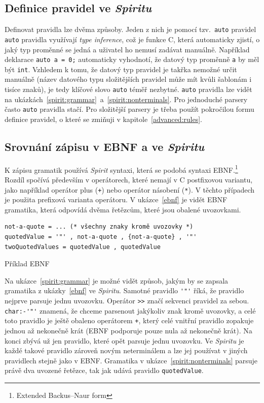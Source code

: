 \documentclass[thesis=B,czech,hidelinks]{FITthesis}[2019/03/06]
\newcommand{\Rplus}{\protect\hspace{-.1em}\protect\raisebox{.35ex}{\smaller{\smaller\textbf{+}}}}
\newcommand{\Cpp}{\mbox{C\Rplus\Rplus}\xspace}
\begin{document}
\subsection{Definice pravidel ve \textit{Spiritu}}
Definovat pravidla lze dvěma způsoby. Jeden z nich je pomocí tzv.\ \texttt{auto} pravidel \texttt{auto} pravidla využívají \textit{type inference}, což je funkce \Cpp{}, která automaticky zjistí, o jaký typ proměnné se jedná a uživatel ho nemusí zadávat manuálně. Například deklarace \verb¨auto a = 0;¨ automaticky vyhodnotí, že datový typ proměnně \texttt{a} by měl být \texttt{int}. Vzhledem k tomu, že datový typ pravidel je takřka nemožné určit manuálně (název datového typu složitějších pravidel může mít kvůli šablonám i tisíce znaků), je tedy klíčové slovo \texttt{auto} téměř nezbytné. \texttt{auto} pravidla lze vidět na ukázkách~\ref{spirit:grammar}~a~\ref{spirit:nonterminals}. Pro jednoduché parsery často \texttt{auto} pravidla stačí. Pro složitější parsery je třeba použít pokročilou formu definice pravidel, o které se zmiňuji v kapitole~\ref{advanced:rules}.

\subsection{Srovnání zápisu v EBNF a ve \textit{Spiritu}}
K zápisu gramatik používá \textit{Spirit} syntaxi, která se podobá syntaxi EBNF.\footnote{Extended Backus--Naur form} Rozdíl spočívá především v operátorech, které nemají v \Cpp{} postfixovou variantu, jako například operátor plus (\texttt{+}) nebo operátor násobení (\texttt{*}). V těchto případech je použita prefixová varianta operátoru. V ukázce~\ref{ebnf} je vidět EBNF gramatika, která odpovídá dvěma řetězcům, které jsou obalené uvozovkami.

\begin{listing}
\begin{verbatim}
not-a-quote = ... (* všechny znaky kromě uvozovky *)
quotedValue = '"' , not-a-quote , {not-a-quote} , '"'
twoQuotedValues = quotedValue , quotedValue
\end{verbatim}
\caption{Příklad EBNF}\label{ebnf}
\end{listing}

Na ukázce~\ref{spirit:grammar} je možné vidět způsob, jakým by se zapsala gramatika z ukázky~\ref{ebnf} ve \textit{Spiritu}. Samotné pravidlo \verb¨'"'¨ říká, že pravidlo nejprve parsuje jednu uvozovku. Operátor \verb¨>>¨ značí sekvenci pravidel za sebou. \verb¨char:-'"'¨ znamená, že chceme parsenout jakýkoliv znak kromě uvozovky, a celé toto pravidlo je ještě obaleno operátorem \verb¨+¨, který celé vnitřní pravidlo zopakuje jednou až nekonečně krát (EBNF podporuje pouze nula až nekonečně krát). Na konci zbývá už jen pravidlo, které opět parsuje jednu uvozovku. Ve \textit{Spiritu} je každé takové pravidlo zároveň novým neterminálem a lze jej používat v jiných pravidlech stejně jako v EBNF\@. Gramatika v ukázce~\ref{spirit:nonterminals} parsuje právě dva uvozené řetězce, tak jak udává pravidlo \texttt{quotedValue}.
\end{document}
